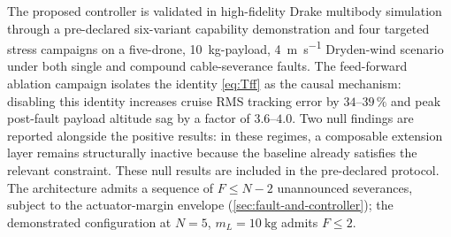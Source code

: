 The proposed controller is validated in high-fidelity Drake multibody simulation through a pre-declared six-variant capability demonstration and four targeted stress campaigns on a five-drone, \SI{10}{\kilo\gram}-payload, \SI{4}{\metre\per\second} Dryden-wind scenario under both single and compound cable-severance faults. The feed-forward ablation campaign isolates the identity \eqref{eq:Tff} as the causal mechanism: disabling this identity increases cruise RMS tracking error by $34$--$39\,\%$ and peak post-fault payload altitude sag by a factor of $3.6$--$4.0$. Two null findings are reported alongside the positive results: in these regimes, a composable extension layer remains structurally inactive because the baseline already satisfies the relevant constraint. These null results are included in the pre-declared protocol. The architecture admits a sequence of $F \le N - 2$ unannounced severances, subject to the actuator-margin envelope (\cref{sec:fault-and-controller}); the demonstrated configuration at $N=5$, $m_L=\SI{10}{\kilo\gram}$ admits $F \le 2$.

